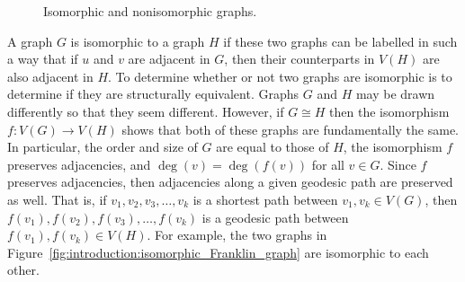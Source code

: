 \begin{figure}[!htbp]
\centering
{}
\quad
{}
\quad
{}
\caption{Isomorphic and nonisomorphic graphs.}
\label{fig:introduction:isomorphic_graphs}
\end{figure}

A graph $G$ is isomorphic to a graph $H$ if these two graphs can be
labelled in such a way that if $u$ and $v$ are adjacent in $G$, then
their counterparts in $V(H)$ are also adjacent in $H$. To determine
whether or not two graphs are isomorphic is to determine if they are
structurally equivalent. Graphs $G$ and $H$ may be drawn differently
so that they seem different. However, if $G \cong H$ then the
isomorphism $f: V(G) \to V(H)$ shows that both of these
graphs are fundamentally the same. In particular, the order and size
of $G$ are equal to those of $H$, the isomorphism $f$ preserves
adjacencies, and $\deg(v) = \deg(f(v))$ for all $v \in G$. Since $f$
preserves adjacencies, then adjacencies along a given geodesic path
are preserved as well. That is, if $v_1, v_2, v_3, \dots, v_k$ is a
shortest path between $v_1, v_k \in V(G)$, then
$f(v_1), f(v_2), f(v_3), \dots, f(v_k)$ is a geodesic path between
$f(v_1), f(v_k) \in V(H)$. For example, the two graphs in
Figure~\ref{fig:introduction:isomorphic_Franklin_graph} are isomorphic
to each other.

